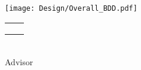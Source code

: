 
\settowidth{\unitlength}{\titleMain}

\begin{titlingpage}
\centering

{
	\color{LightGoldenrod}
	\resizebox*{\unitlength}{\baselineskip}{\rotateright{$\}$}}
} \\ [\baselineskip]

{
	\color{Sienna}
	\titleMain
} \\ [\baselineskip]


{
	\color{RosyBrown}
	\titleSemester \\
}

{
	\color{LightGoldenrod}
	\resizebox*{\unitlength}{\baselineskip}{\rotateleft{$\}$}}
}

\vfill

\texttt{[image: Design/Overall\_BDD.pdf]}

\vfill

\begin{tabu} to \linewidth {X[1,c] X[1,c]}
\authorOneName						& \authorTwoName \\
\authorOneID						& \authorTwoID \\
									& \\
\end{tabu} \\ [2\baselineskip]

{
	{\Large Advisor} \\
	\advisorName
}

\end{titlingpage}
